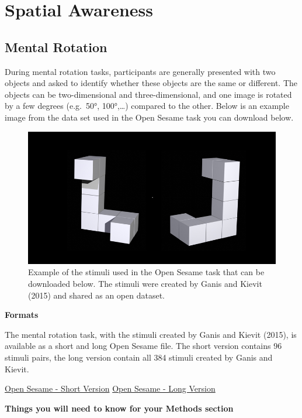 \documentclass[
]{book}
\begin{document}
\hypertarget{spatial-awareness}{%
\chapter{Spatial Awareness}\label{spatial-awareness}}

\hypertarget{mental-rotation}{%
\section{Mental Rotation}\label{mental-rotation}}

During mental rotation tasks, participants are generally presented with two objects and asked to identify whether these objects are the same or different. The objects can be two-dimensional and three-dimensional, and one image is rotated by a few degrees (e.g.~50°, 100°,\ldots) compared to the other. Below is an example image from the data set used in the Open Sesame task you can download below.

\begin{figure}

{\centering \includegraphics[width=0.75\linewidth]{images/RotationExample} 

}

\caption{Example of the stimuli used in the Open Sesame task that can be downloaded below. The stimuli were created by Ganis and Kievit (2015) and shared as an open dataset.}\label{fig:Figure5-1}
\end{figure}

\textbf{Formats}

The mental rotation task, with the stimuli created by Ganis and Kievit (2015), is available as a short and long Open Sesame file. The short version contains 96 stimuli pairs, the long version contain all 384 stimuli created by Ganis and Kievit.

\href{link\%20to\%20file}{Open Sesame - Short Version} \textbar{} \href{link\%20to\%20file}{Open Sesame - Long Version}

\textbf{Things you will need to know for your Methods section}
\end{document}
